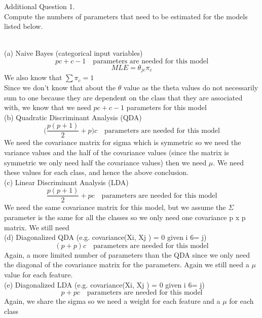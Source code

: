 \documentclass[draft]{exam} %
\theoremstyle{definition} \newtheorem*{defn}{Definition}
\begin{document}
\begin{questions}
\question Additional Question 1. \\
Compute the numbers of parameters that need to be estimated for the models listed below. \\

\begin{solution}  \\%
(a) Naive Bayes (categorical input variables) \\
$$pc + c -1 \quad \text{parameters are needed for this model}$$
$$MLE = \theta_{jc} \pi_c$$
We also know that $\sum{\pi_c} = 1$\\
Since we don't know that about the $\theta$ value as the theta values do not necessarily sum to one because they are dependent on the class that they are associated with, we know that we need $pc + c -1$ parameters for this model\\

(b) Quadratic Discriminant Analysis (QDA) \\
$$\Big(\frac{p(p+1)}{2}+ p \Big)c \quad \text{parameters are needed for this model}$$
We need the covariance matrix for sigma which is symmetric so we need the variance values and the half of the covariance values (since the matrix is symmetric we only need half the covariance values) then we need $\mu$.  We need these values for each class, and hence the above conclusion.\\

(c) Linear Discriminant Analysis (LDA) \\
$$\frac{p(p+1)}{2}+ p c \quad \text{parameters are needed for this model}$$
We need the same covariance matrix for this model, but we assume the $\Sigma$ parameter is the same for all the classes so we only need one covariance p x p matrix.  We still need\\

(d) Diagonalized QDA (e.g. covariance(Xi, Xj ) = 0 given i 6= j) \\
$$(p + p)c \quad \text{parameters are needed for this model}$$
Again, a more limited number of parameters than the QDA since we only need the diagonal of the covariance matrix for the parameters.  Again we still need a $\mu$ value for each feature.\\

(e) Diagonalized LDA (e.g. covariance(Xi, Xj ) = 0 given i 6= j) \\
$$p + p c \quad \text{parameters are needed for this model}$$
Again, we share the sigma so we need a weight for each feature and a $\mu$ for each class\\


\end{solution}
\end{questions}
\end{document}
